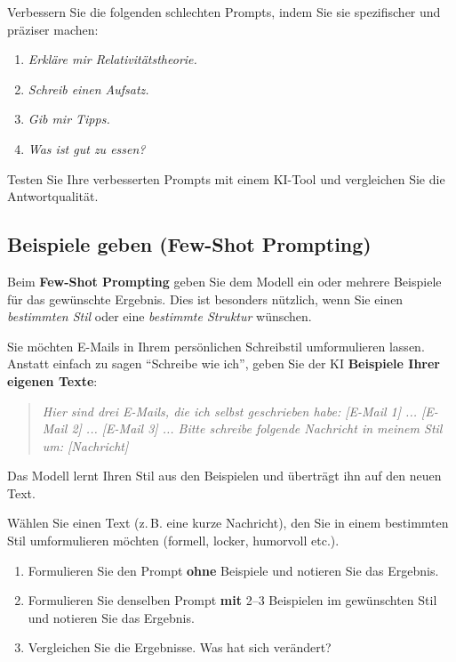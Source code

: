 \begin{myexercise}
Verbessern Sie die folgenden schlechten Prompts, indem Sie sie spezifischer
und präziser machen:

\begin{enumerate}
    \item \textit{Erkläre mir Relativitätstheorie.}
    \item \textit{Schreib einen Aufsatz.}
    \item \textit{Gib mir Tipps.}
    \item \textit{Was ist gut zu essen?}
\end{enumerate}

Testen Sie Ihre verbesserten Prompts mit einem KI-Tool und vergleichen Sie
die Antwortqualität.
\end{myexercise}

\subsection{Beispiele geben (Few-Shot Prompting)}

\begin{mydefinition}
Beim \textbf{Few-Shot Prompting} geben Sie dem Modell ein oder mehrere Beispiele
für das gewünschte Ergebnis. Dies ist besonders nützlich, wenn Sie einen
\emph{bestimmten Stil} oder eine \emph{bestimmte Struktur} wünschen.
\end{mydefinition}

\begin{myexample}
Sie möchten E-Mails in Ihrem persönlichen Schreibstil umformulieren lassen.
Anstatt einfach zu sagen \enquote{Schreibe wie ich}, geben Sie der KI
\textbf{Beispiele Ihrer eigenen Texte}:

\begin{quote}
\textit{Hier sind drei E-Mails, die ich selbst geschrieben habe: [E-Mail 1] ... [E-Mail 2] ...
[E-Mail 3] ... Bitte schreibe folgende Nachricht in meinem Stil um: [Nachricht]}
\end{quote}

Das Modell lernt Ihren Stil aus den Beispielen und überträgt ihn auf den neuen Text.
\end{myexample}

\begin{myexercise}
Wählen Sie einen Text (z.\,B. eine kurze Nachricht), den Sie in einem
bestimmten Stil umformulieren möchten (formell, locker, humorvoll etc.).

\begin{enumerate}
    \item Formulieren Sie den Prompt \textbf{ohne} Beispiele und notieren Sie
          das Ergebnis.
    \item Formulieren Sie denselben Prompt \textbf{mit} 2--3 Beispielen
          im gewünschten Stil und notieren Sie das Ergebnis.
    \item Vergleichen Sie die Ergebnisse. Was hat sich verändert?
\end{enumerate}
\end{myexercise}

